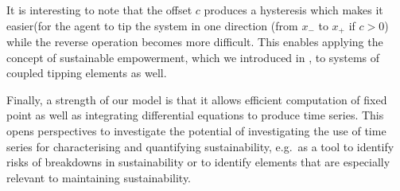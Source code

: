 \documentclass[conference]{IEEEtran}
\begin{document}
It is interesting to note that the offset $c$ produces a hysteresis
which makes it easier(for the agent to tip the system in one direction
(from $x_{-}$ to $x_{+}$ if $c > 0$) while the reverse operation
becomes more difficult. This enables applying the concept of
sustainable empowerment, which we introduced in
\cite{Kim2009_sustainability}, to systems of coupled tipping elements
as well.

Finally, a strength of our model is that it allows efficient
computation of fixed point as well as integrating differential
equations to produce time series. This opens perspectives to
investigate the potential of investigating the use of time series for
characterising and quantifying sustainability, e.g.\ as a tool to
identify risks of breakdowns in sustainability or to identify elements
that are especially relevant to maintaining sustainability.










\end{document}
